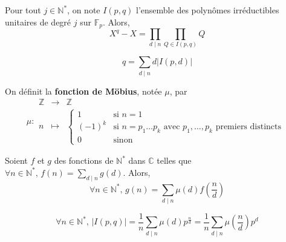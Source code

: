   \begin{theorem}
    Pour tout $j \in \mathbb{N}^*$, on note $I(p,q)$ l'ensemble des polynômes irréductibles unitaires de degré $j$ sur $\mathbb{F}_p$. Alors,
    \[ X^q - X = \prod_{d \mid n} \prod_{Q \in I(p,q)} Q \]
  \end{theorem}

  \begin{corollary}
    \[ q = \sum_{d \mid n} d \vert I(p,d) \vert \]
  \end{corollary}

  \begin{definition}
    On définit la \textbf{fonction de Möbius}, notée $\mu$, par
    \[
      \mu :
      \begin{array}{ccc}
        \mathbb{Z} &\rightarrow& \mathbb{Z} \\
        n &\mapsto& \begin{cases}
          1 &\text{si } n = 1 \\
          (-1)^k &\text{si } n = p_1 \dots p_k \text{ avec } p_1, \dots, p_k \text{ premiers distincts} \\
          0 &\text{sinon}
        \end{cases}
      \end{array}
    \]
  \end{definition}

  \begin{theorem}
    Soient $f$ et $g$ des fonctions de $\mathbb{N}^*$ dans $\mathbb{C}$ telles que $\forall n \in \mathbb{N}^*, \, f(n) = \sum_{d \mid n} g(d)$. Alors,
    \[ \forall n \in \mathbb{N}^*, \, g(n) = \sum_{d \mid n} \mu(d) f \left( \frac{n}{d} \right) \]
  \end{theorem}

  \begin{corollary}
    \[ \forall n \in \mathbb{N}^*, \, \vert I(p,q) \vert = \frac{1}{n} \sum_{d \mid n} \mu(d) p^{\frac{n}{d}} = \frac{1}{n} \sum_{d \mid n} \mu \left( \frac{n}{d} \right) p^{d} \]
  \end{corollary}

